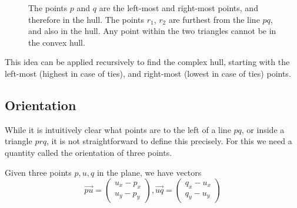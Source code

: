 \begin{figure}[ht]
{
    }
    \caption{The points $p$ and $q$ are the left-most and 
             right-most points, and therefore in the hull. The points $r_1$,
             $r_2$ are furthest from the line $pq$, and also in the hull. Any
             point within the two triangles cannot be in the convex hull.}
    \label{fig:quickhull}
\end{figure}

This idea can be applied recursively to find the complex hull, starting with
the left-most (highest in case of ties), and right-most (lowest in case of ties)
points.

\subsection{Orientation}

While it is intuitively clear what points are to the left of a line $pq$, or
inside a triangle $prq$, it is not straightforward to define this precisely.
For this we need a quantity called the orientation of three points.

Given three points $p, u, q$ in the plane, we have vectors
\[
    \vec{pu} = \begin{pmatrix}
        u_x - p_x \\
        u_y - p_y
    \end{pmatrix},
    \vec{uq} = \begin{pmatrix}
        q_x - u_x \\
        q_y - u_y
    \end{pmatrix}
\]

